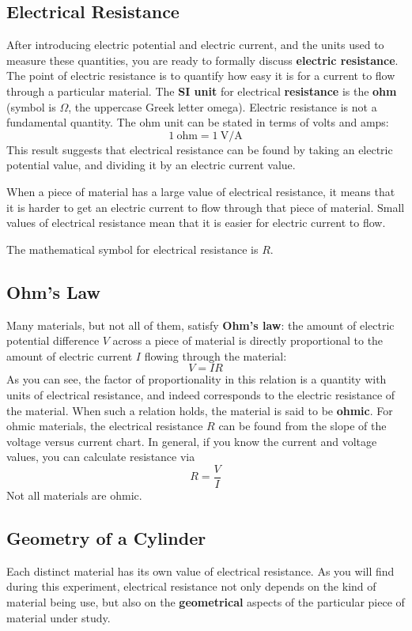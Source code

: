 \subsection{Electrical Resistance}
%
After introducing electric potential and electric current, and the units used to measure these quantities, you are ready to formally discuss \textbf{electric resistance}. The point of electric resistance is to quantify how easy it is for a current to flow through a particular material. The \textbf{SI unit} for electrical \textbf{resistance} is the \textbf{ohm} (symbol is $\Omega$, the uppercase Greek letter omega). Electric resistance is not a fundamental quantity. The ohm unit can be stated in terms of volts and amps:
\begin{equation}
	1 \ \text{ohm} = 1 \ \text{V/A}
\end{equation}
This result suggests that electrical resistance can be found by taking an electric potential value, and dividing it by an electric current value.

When a piece of material has a large value of electrical resistance, it means that it is harder to get an electric current to flow through that piece of material. Small values of electrical resistance mean that it is easier for electric current to flow.

The mathematical symbol for electrical resistance is $R$.
%
\subsection{Ohm's Law}
%
Many materials, but not all of them, satisfy \textbf{Ohm's law}: the amount of electric potential difference $V$ across a piece of material is directly proportional to the amount of electric current $I$ flowing through the material:
\begin{equation}
	V = IR
\end{equation}
As you can see, the factor of proportionality in this relation is a quantity with units of electrical resistance, and indeed corresponds to the electric resistance of the material. When such a relation holds, the material is said to be \textbf{ohmic}. For ohmic materials, the electrical resistance $R$ can be found from the slope of the voltage versus current chart. In general, if you know the current and voltage values, you can calculate resistance via
\begin{equation}
	R = \frac{V}{I}
	\label{eq.02.ohms.law}
\end{equation}
Not all materials are ohmic.
%
\subsection{Geometry of a Cylinder}
%
Each distinct material has its own value of electrical resistance. As you will find during this experiment, electrical resistance not only depends on the kind of material being use, but also on the \textbf{geometrical} aspects of the particular piece of material under study.


